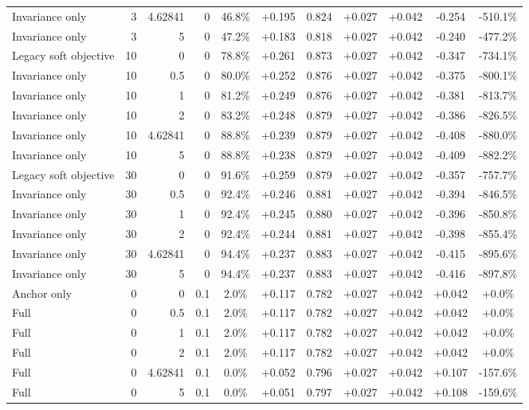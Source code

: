 \begin{table}[htbp]
\begin{tabular}{lrrrccccccc}
Invariance only & 3 & 4.62841 & 0 & 46.8\% & +0.195 & 0.824 & +0.027 & +0.042 & -0.254 & -510.1\% \\
Invariance only & 3 & 5 & 0 & 47.2\% & +0.183 & 0.818 & +0.027 & +0.042 & -0.240 & -477.2\% \\
Legacy soft objective & 10 & 0 & 0 & 78.8\% & +0.261 & 0.873 & +0.027 & +0.042 & -0.347 & -734.1\% \\
Invariance only & 10 & 0.5 & 0 & 80.0\% & +0.252 & 0.876 & +0.027 & +0.042 & -0.375 & -800.1\% \\
Invariance only & 10 & 1 & 0 & 81.2\% & +0.249 & 0.876 & +0.027 & +0.042 & -0.381 & -813.7\% \\
Invariance only & 10 & 2 & 0 & 83.2\% & +0.248 & 0.879 & +0.027 & +0.042 & -0.386 & -826.5\% \\
Invariance only & 10 & 4.62841 & 0 & 88.8\% & +0.239 & 0.879 & +0.027 & +0.042 & -0.408 & -880.0\% \\
Invariance only & 10 & 5 & 0 & 88.8\% & +0.238 & 0.879 & +0.027 & +0.042 & -0.409 & -882.2\% \\
Legacy soft objective & 30 & 0 & 0 & 91.6\% & +0.259 & 0.879 & +0.027 & +0.042 & -0.357 & -757.7\% \\
Invariance only & 30 & 0.5 & 0 & 92.4\% & +0.246 & 0.881 & +0.027 & +0.042 & -0.394 & -846.5\% \\
Invariance only & 30 & 1 & 0 & 92.4\% & +0.245 & 0.880 & +0.027 & +0.042 & -0.396 & -850.8\% \\
Invariance only & 30 & 2 & 0 & 92.4\% & +0.244 & 0.881 & +0.027 & +0.042 & -0.398 & -855.4\% \\
Invariance only & 30 & 4.62841 & 0 & 94.4\% & +0.237 & 0.883 & +0.027 & +0.042 & -0.415 & -895.6\% \\
Invariance only & 30 & 5 & 0 & 94.4\% & +0.237 & 0.883 & +0.027 & +0.042 & -0.416 & -897.8\% \\
Anchor only & 0 & 0 & 0.1 & 2.0\% & +0.117 & 0.782 & +0.027 & +0.042 & +0.042 & +0.0\% \\
Full & 0 & 0.5 & 0.1 & 2.0\% & +0.117 & 0.782 & +0.027 & +0.042 & +0.042 & +0.0\% \\
Full & 0 & 1 & 0.1 & 2.0\% & +0.117 & 0.782 & +0.027 & +0.042 & +0.042 & +0.0\% \\
Full & 0 & 2 & 0.1 & 2.0\% & +0.117 & 0.782 & +0.027 & +0.042 & +0.042 & +0.0\% \\
Full & 0 & 4.62841 & 0.1 & 0.0\% & +0.052 & 0.796 & +0.027 & +0.042 & +0.107 & -157.6\% \\
Full & 0 & 5 & 0.1 & 0.0\% & +0.051 & 0.797 & +0.027 & +0.042 & +0.108 & -159.6\% \\

\end{tabular}
\end{table}
